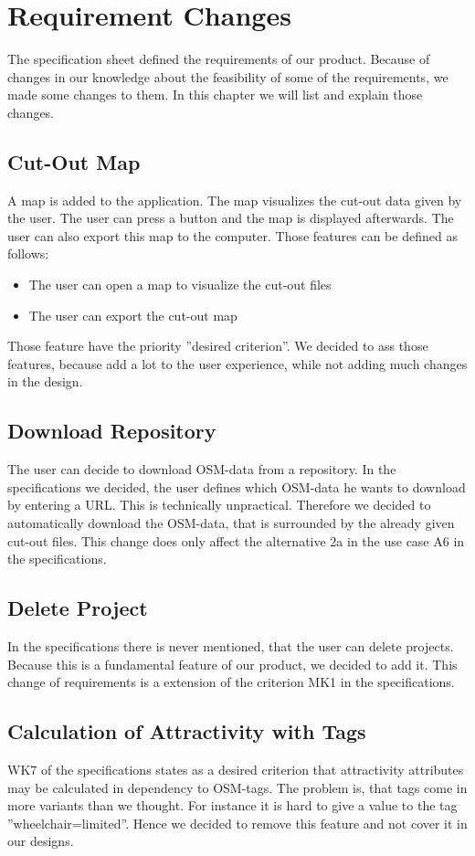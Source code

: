 \documentclass[parskip=full]{report} %
\begin{document}
\chapter{Requirement Changes}
The specification sheet defined the requirements of our product. Because of changes in our knowledge about the feasibility of some of the requirements, we made some changes to them. In this chapter we will list and explain those changes.

\section*{Cut-Out Map}
A map is added to the application. The map visualizes the cut-out data given by the user. The user can press a button and the map is displayed afterwards. The user can also export this map to the computer. Those features can be defined as follows:
\begin{itemize}
    \item <WK9> The user can open a map to visualize the cut-out files
    \item <WK10> The user can export the cut-out map
\end{itemize}
Those feature have the priority ''desired criterion''. We decided to ass those features, because add a lot to the user experience, while not adding much changes in the design.

\section*{Download Repository}
The user can decide to download OSM-data from a repository. In the specifications we decided, the user defines which OSM-data he wants to download by entering a URL. This is technically unpractical. Therefore we decided to automatically download the OSM-data, that is surrounded by the already given cut-out files. This change does only affect the alternative 2a in the use case A6 in the specifications.

\section*{Delete Project}
In the specifications there is never mentioned, that the user can delete projects. Because this is a fundamental feature of our product, we decided to add it. This change of requirements is a extension of the criterion MK1 in the specifications.

\section*{Calculation of Attractivity with Tags}
WK7 of the specifications states as a desired criterion that attractivity attributes may be calculated in dependency to OSM-tags. The problem is, that tags come in more variants than we thought. For instance it is hard to give a value to the tag ''wheelchair=limited''. Hence we decided to remove this feature and not cover it in our designs.
\end{document}
